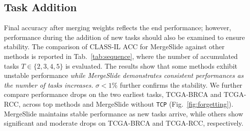 \documentclass[10pt,twocolumn,letterpaper]{article}
\begin{document}
\subsection{Task Addition} Final accuracy after merging weights reflects the end performance; however, performance during the addition of new tasks should also be examined to ensure stability. The comparison of CLASS-IL ACC for MergeSlide against other methods is reported in Tab.~\ref{tab:sequence}, where the number of accumulated tasks $T \in \{2, 3, 4, 5\}$ is evaluated. The results show that some methods exhibit unstable performance \textit{while MergeSlide demonstrates consistent performances as the number of tasks increases.} $\sigma < 1\%$ further confirms the stability. We further compare performance drops on the two earliest tasks, TCGA-BRCA and TCGA-RCC, across top methods and MergeSlide without \texttt{TCP} (Fig.~\ref{fig:forgetting}). MergeSlide maintains stable performance as new tasks arrive, while others show significant and moderate drops on TCGA-BRCA and TCGA-RCC, respectively.

\begin{table}[H]
\centering
{}
\caption{Closer look at MergeSlide compared to other continual learning methods as the number of tasks increases on the sequence of \textcolor{blue}{B}$\rightarrow$\textcolor{blue}{R}$\rightarrow$\textcolor{blue}{N}$\rightarrow$\textcolor{red}{E}$\rightarrow$\textcolor{red}{T}$\rightarrow$\textcolor{red}{C} (Metric: CLASS-IL ACC). $\sigma$ shows the standard deviation of results across $T \in \{2, 3, 4, 5\}$.}
\label{tab:sequence}
\end{table}
\end{document}
